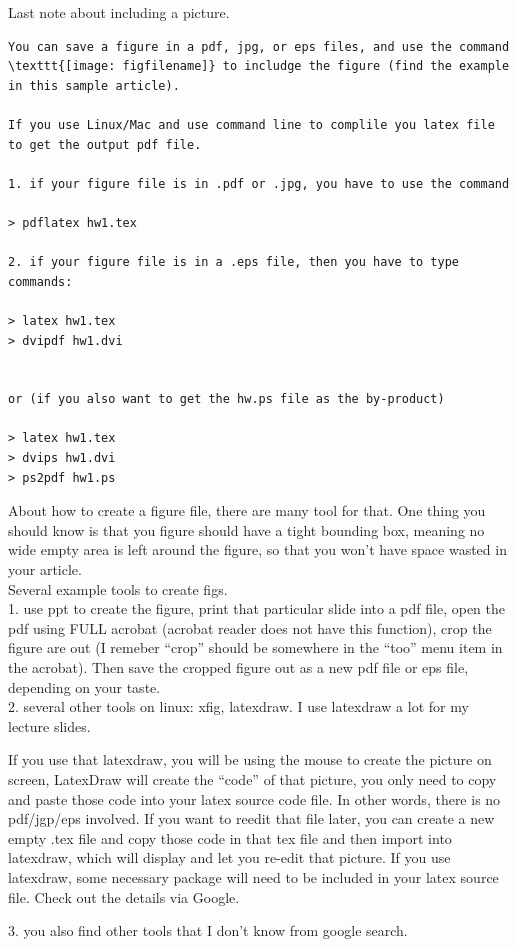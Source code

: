 \documentclass[11pt]{article}
\begin{document}
\bigskip 


Last note about including a picture. 

\begin{verbatim}
You can save a figure in a pdf, jpg, or eps files, and use the command
\texttt{[image: figfilename]} to includge the figure (find the example
in this sample article). 

If you use Linux/Mac and use command line to complile you latex file
to get the output pdf file. 

1. if your figure file is in .pdf or .jpg, you have to use the command

> pdflatex hw1.tex

2. if your figure file is in a .eps file, then you have to type
commands:

> latex hw1.tex
> dvipdf hw1.dvi


or (if you also want to get the hw.ps file as the by-product)

> latex hw1.tex
> dvips hw1.dvi
> ps2pdf hw1.ps

\end{verbatim}

\newpage


About how to create a figure file, there are many tool for that. One
thing you should know is that you figure should have a tight bounding
box, meaning no wide empty area is left around the figure, so that
you won't have space wasted in your article.\\


Several example tools to create figs. \\

1. use ppt to create the figure, print that particular slide into a
pdf file, open the pdf using FULL acrobat (acrobat reader does not
have this function), crop the figure are out (I remeber ``crop''
should be somewhere in the ``too'' menu item in the acrobat).  Then
save the cropped figure out as a new pdf file or eps file, depending
on your taste. \\

2. several other tools on linux: xfig, latexdraw. I use latexdraw a
lot for my lecture slides. 

If you use that latexdraw, you will be using the
mouse to create the picture on screen, LatexDraw will create the
``code'' of that picture, you only need to copy and paste those code
into your latex source code file. In other words, there is no
pdf/jgp/eps involved. If you want to reedit that file later, you can
create a new empty .tex file and copy those code in that tex file and
then import into latexdraw, which will display and let you re-edit
that picture. If you use latexdraw, some necessary package will need
to be included in your latex source file. Check out the details via
Google. 


3. you also find other tools that I don't know from google search.  
\end{document}
